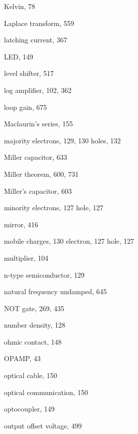 \begin{theindex}
\begin{otherlanguage}{english}
  \indexspace

  \item Kelvin, 78

  \indexspace

  \item Laplace transform, 559
  \item latching current, 367
  \item LED, 149
  \item level shifter, 517
  \item log amplifier, 102, 362
  \item loop gain, 675

  \indexspace

  \item Maclaurin's series, 155
  \item majority
    \subitem electrons, 129, 130
    \subitem holes, 132
  \item Miller capacitor, 633
  \item Miller theorem, 600, 731
  \item Miller's capacitor, 603
  \item minority
    \subitem electrons, 127
    \subitem hole, 127
  \item mirror, 416
  \item mobile
    \subitem charges, 130
    \subitem electron, 127
    \subitem hole, 127
  \item multiplier, 104

  \indexspace

  \item n-type semiconductor, 129
  \item natural frequency
    \subitem undamped, 645
  \item NOT gate, 269, 435
  \item number density, 128

  \indexspace

  \item ohmic contact, 148
  \item OPAMP, 43
  \item optical cable, 150
  \item optical communication, 150
  \item optocoupler, 149
  \item output offset voltage, 499

  \indexspace


\end{otherlanguage}
\end{theindex}
